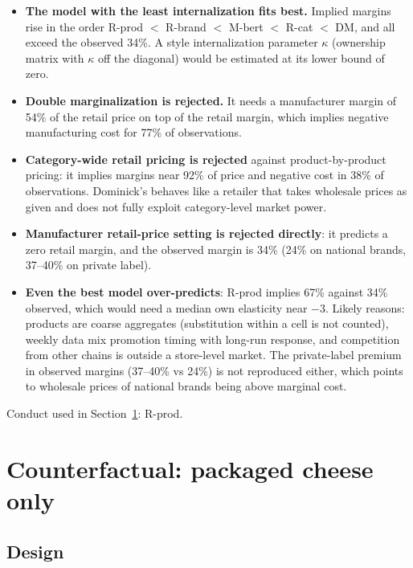 \documentclass[11pt]{article}
\newcommand{\model}[1]{\textsf{#1}}
\begin{document}
\begin{itemize}
  \item \textbf{The model with the least internalization fits best.} Implied margins rise in
        the order \model{R-prod} $<$ \model{R-brand} $<$ \model{M-bert} $<$ \model{R-cat}
        $<$ \model{DM}, and all exceed the observed 34\%. A \citet{millerweinberg2017} style
        internalization parameter $\kappa$ (ownership matrix with $\kappa$ off the diagonal)
        would be estimated at its lower bound of zero.
  \item \textbf{Double marginalization is rejected.} It needs a manufacturer margin of 54\%
        of the retail price on top of the retail margin, which implies negative
        manufacturing cost for 77\% of observations.
  \item \textbf{Category-wide retail pricing is rejected} against product-by-product
        pricing: it implies margins near 92\% of price and negative cost in 38\% of
        observations. Dominick's behaves like a retailer that takes wholesale prices as
        given and does not fully exploit category-level market power.
  \item \textbf{Manufacturer retail-price setting is rejected directly}: it predicts a zero
        retail margin, and the observed margin is 34\% (24\% on national brands, 37--40\% on
        private label).
  \item \textbf{Even the best model over-predicts}: \model{R-prod} implies 67\% against 34\%
        observed, which would need a median own elasticity near $-3$. Likely reasons:
        products are coarse aggregates (substitution within a cell is not counted), weekly
        data mix promotion timing with long-run response, and competition from other chains
        is outside a store-level market. The private-label premium in observed margins
        (37--40\% vs 24\%) is not reproduced either, which points to wholesale prices of
        national brands being above marginal cost.
\end{itemize}

Conduct used in Section~\ref{sec:cf}: \model{R-prod}.

\section{Counterfactual: packaged cheese only}\label{sec:cf}

\subsection{Design}
\end{document}
